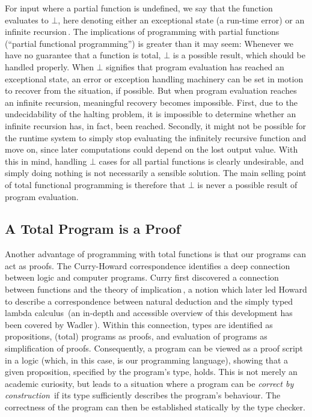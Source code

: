 For input  where a partial function is undefined, we say that
the function evaluates to $\bot$, here denoting either an exceptional state (a
run-time error) or an infinite recursion\,\citep{Turner04totalfunctional}. The
implications of programming with partial functions (``partial functional
programming'') is greater than it may seem: Whenever we have no guarantee that a
function is total, $\bot$ is a possible result, which should be handled
properly. When $\bot$ signifies that program evaluation has reached an
exceptional state, an error or exception handling machinery can be set in motion
to recover from the situation, if possible. But when program evaluation reaches
an infinite recursion, meaningful recovery becomes impossible. First, due to the
undecidability of the halting problem, it is impossible to determine whether an
infinite recursion has, in fact, been reached. Secondly, it might not be
possible for the runtime system to simply stop evaluating the infinitely
recursive function and move on, since later computations could depend on the lost
output value. With this in mind, handling $\bot$ cases for all partial functions
is clearly undesirable, and simply doing nothing is not necessarily a sensible
solution. The main selling point of total functional programming is therefore
that $\bot$ is never a possible result of program evaluation.

\subsection{A Total Program is a Proof}
Another advantage of programming with total functions is that our programs can
act as proofs. The Curry-Howard correspondence identifies a
deep connection between logic and computer programs. Curry first discovered a
connection between functions and the theory of implication\,\citep{Curry1934}, a
notion which later led Howard to describe a correspondence between natural
deduction and the simply typed lambda calculus\,\citep{Howard80} (an in-depth
and accessible overview of this development has been covered by
Wadler\,\citep{Wadler2014}). Within this connection, types are identified as
propositions, (total) programs as proofs, and evaluation of programs as
simplification of proofs. Consequently, a program can be viewed as a proof
script in a logic (which, in this case, is our programming language), showing
that a given proposition, specified by the program's type, holds. This is not
merely an academic curiosity, but leads to a situation where a program can be
\emph{correct by construction}\,\citep{Pierce:2002:TPL:509043} if its type
sufficiently describes the program's behaviour. The correctness of the program
can then be established statically by the type checker.

